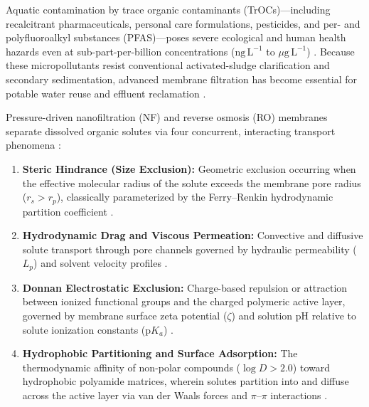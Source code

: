 \documentclass[11pt]{article}
\begin{document}
Aquatic contamination by trace organic contaminants (TrOCs)---including recalcitrant pharmaceuticals, personal care formulations, pesticides, and per- and polyfluoroalkyl substances (PFAS)---poses severe ecological and human health hazards even at sub-part-per-billion concentrations ($\mathrm{ng\,L^{-1}}$ to $\mu\mathrm{g\,L^{-1}}$) \cite{schwarzenbach2006,shannon2008,bellona2004}. Because these micropollutants resist conventional activated-sludge clarification and secondary sedimentation, advanced membrane filtration has become essential for potable water reuse and effluent reclamation \cite{verliefde2007,elimelech2011,werber2016,mohammad2015}.

Pressure-driven nanofiltration (NF) and reverse osmosis (RO) membranes separate dissolved organic solutes via four concurrent, interacting transport phenomena \cite{vanderbruggen2003,yangaliquintanilla2009}:
\begin{enumerate}[leftmargin=1.3em,itemsep=2pt,topsep=3pt]
\item \textbf{Steric Hindrance (Size Exclusion):} Geometric exclusion occurring when the effective molecular radius of the solute exceeds the membrane pore radius ($r_s > r_p$), classically parameterized by the Ferry--Renkin hydrodynamic partition coefficient \cite{ferry1936,renkin1954}.
\item \textbf{Hydrodynamic Drag and Viscous Permeation:} Convective and diffusive solute transport through pore channels governed by hydraulic permeability ($L_p$) and solvent velocity profiles \cite{spiegler1966,kedem1958}.
\item \textbf{Donnan Electrostatic Exclusion:} Charge-based repulsion or attraction between ionized functional groups and the charged polymeric active layer, governed by membrane surface zeta potential ($\zeta$) and solution pH relative to solute ionization constants ($\mathrm{p}K_a$) \cite{bowen2002,bowen1998}.
\item \textbf{Hydrophobic Partitioning and Surface Adsorption:} The thermodynamic affinity of non-polar compounds ($\log D > 2.0$) toward hydrophobic polyamide matrices, wherein solutes partition into and diffuse across the active layer via van der Waals forces and $\pi$--$\pi$ interactions \cite{kiso2001,nghiem2005}.
\end{enumerate}
\end{document}
